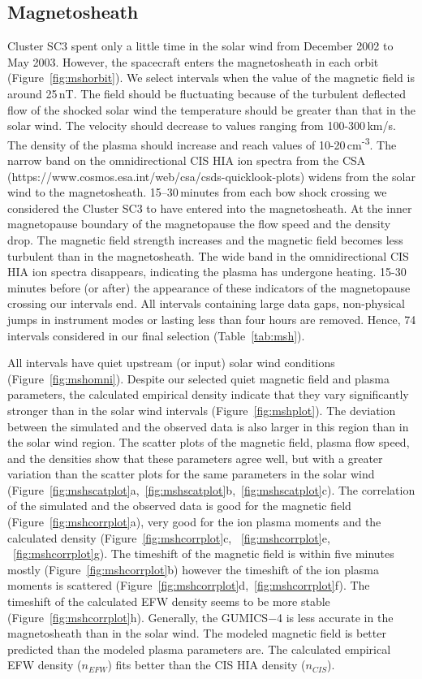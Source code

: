 \documentclass[linenumbers,draft]{agujournal}
\begin{document}
\subsection{Magnetosheath}
\label{sec:msh}

Cluster SC3 spent only a little time in the solar wind from December 2002 to May 2003. However, the spacecraft enters the magnetosheath in each orbit (Figure~\ref{fig:mshorbit}). We select intervals when the value of the magnetic field is around 25\,nT. The field should be fluctuating because of the turbulent deflected flow of the shocked solar wind the temperature should be greater than that in the solar wind. The velocity should decrease to values ranging from 100-300\,km/s. The density of the plasma should increase and reach values of 10-20\,cm\textsuperscript{-3}. The narrow band on the omnidirectional CIS HIA ion spectra from the CSA (https://www.cosmos.esa.int/web/csa/csds-quicklook-plots) widens from the solar wind to the magnetosheath. 15--30\,minutes from each bow shock crossing we considered the Cluster SC3 to have entered into the magnetosheath. At the inner magnetopause boundary of the magnetopause the flow speed and the density drop. The magnetic field strength increases and the magnetic field becomes less turbulent than in the magnetosheath. The wide band in the omnidirectional CIS HIA ion spectra disappears, indicating the plasma has undergone heating. 15-30 minutes before (or after) the appearance of these indicators of the magnetopause crossing our intervals end. All intervals containing large data gaps, non-physical jumps in instrument modes or lasting less than four hours are removed. Hence, 74 intervals considered in our final selection (Table~\ref{tab:msh}). 

All intervals have quiet upstream (or input) solar wind conditions (Figure~\ref{fig:mshomni}). Despite our selected quiet magnetic field and plasma parameters, the calculated empirical density indicate that they vary significantly stronger than in the solar wind intervals (Figure~\ref{fig:mshplot}). The deviation between the simulated and the observed data is also larger in this region than in the solar wind region. The scatter plots of the magnetic field, plasma flow speed, and the densities show that these parameters agree well, but with a greater variation than the scatter plots for the same parameters in the solar wind (Figure~\ref{fig:mshscatplot}a,~\ref{fig:mshscatplot}b,~\ref{fig:mshscatplot}c). The correlation of the simulated and the observed data is good for the magnetic field (Figure~\ref{fig:mshcorrplot}a), very good for the ion plasma moments and the calculated density (Figure~\ref{fig:mshcorrplot}c, ~\ref{fig:mshcorrplot}e, ~\ref{fig:mshcorrplot}g). The timeshift of the magnetic field is within five minutes mostly (Figure~\ref{fig:mshcorrplot}b) however the timeshift of the ion plasma moments is scattered (Figure~\ref{fig:mshcorrplot}d,~\ref{fig:mshcorrplot}f). The timeshift of the calculated EFW density seems to be more stable (Figure~\ref{fig:mshcorrplot}h). Generally, the GUMICS$-$4 is less accurate in the magnetosheath than in the solar wind. The modeled magnetic field is better predicted than the modeled plasma parameters are. The calculated empirical EFW density ($n_{EFW}$) fits better than the CIS HIA density ($n_{CIS}$).
\end{document}
